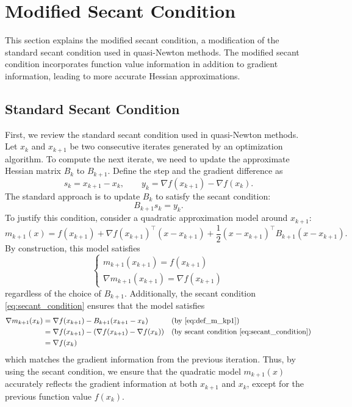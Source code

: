 \documentclass[0_en]{subfiles}
\begin{document}
\section{Modified Secant Condition}\label{sec:background_modified_secant}

This section explains the modified secant condition, a modification of the standard secant condition used in quasi-Newton methods.
The modified secant condition incorporates function value information in addition to gradient information, leading to more accurate Hessian approximations.

\subsection{Standard Secant Condition}
\label{subsec:standard_secant}

First, we review the standard secant condition used in quasi-Newton methods.
Let $x_k$ and $x_{k+1}$ be two consecutive iterates generated by an optimization algorithm.
To compute the next iterate, we need to update the approximate Hessian matrix $B_k$ to $B_{k+1}$.
Define the step and the gradient difference as
\begin{equation*}
    s_k = x_{k+1} - x_k, \qquad
    y_k = \nabla f(x_{k+1}) - \nabla f(x_k).
\end{equation*}
The standard approach is to update $B_k$ to satisfy the secant condition:
\begin{equation}\label{eq:secant_condition}
    B_{k+1} s_k = y_k.
\end{equation}
To justify this condition, consider a quadratic approximation model around $x_{k+1}$:
\begin{equation}\label{eq:def_m_kp1}
    m_{k+1}(x) = f(x_{k+1}) + \nabla f(x_{k+1})^\top (x - x_{k+1}) + \frac{1}{2} (x - x_{k+1})^\top B_{k+1} (x - x_{k+1}).
\end{equation}
By construction, this model satisfies
\begin{equation}\label{eq:two_auto_matches}
    \begin{cases}
        m_{k+1}(x_{k+1}) = f(x_{k+1}) \\
        \nabla m_{k+1}(x_{k+1}) = \nabla f(x_{k+1})
    \end{cases}
\end{equation}
regardless of the choice of $B_{k+1}$.
Additionally, the secant condition \cref{eq:secant_condition} ensures that the model satisfies
\begin{align}\label{eq:grad_k_match}
    \nabla m_{k+1}(x_k) & = \nabla f(x_{k+1}) - B_{k+1} (x_{k+1} - x_k)             &  & (\text{by \cref{eq:def_m_kp1}})                          \\
                        & = \nabla f(x_{k+1}) - (\nabla f(x_{k+1}) - \nabla f(x_k)) &  & \text{(by secant condition \eqref{eq:secant_condition})} \\
                        & = \nabla f(x_k)
\end{align}
which matches the gradient information from the previous iteration.
Thus, by using the secant condition, we ensure that the quadratic model $m_{k+1}(x)$ accurately reflects the gradient information at both $x_{k+1}$ and $x_k$, except for the previous function value $f(x_k)$.
\end{document}
